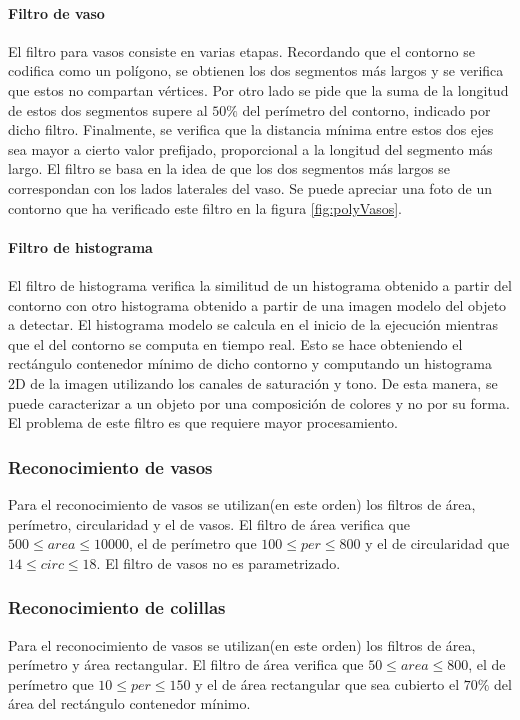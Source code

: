 	\paragraph{Filtro de vaso}
	El filtro para vasos consiste en varias etapas. Recordando que el contorno se codifica como un pol\'igono, se obtienen los dos segmentos 
	m\'as largos y se verifica que estos no compartan v\'ertices. Por otro lado se pide que la suma de la longitud de estos dos segmentos supere al $50\%$ del 
	per\'imetro del contorno, indicado por dicho filtro. Finalmente, se verifica que la distancia m\'inima entre estos dos ejes sea mayor a cierto valor prefijado, proporcional a la
	longitud del segmento m\'as largo. El filtro se basa en la idea de que 
	los dos segmentos m\'as largos se correspondan con los lados laterales 
	del vaso.  Se puede apreciar una foto  de un contorno que ha 
	verificado este filtro en la figura \ref{fig:polyVasos}. 
	\paragraph{Filtro de histograma}
	El filtro de histograma verifica la similitud de un histograma obtenido a partir del contorno con otro histograma obtenido a partir de 
	una imagen modelo del objeto a detectar. El histograma modelo se calcula en el inicio de la ejecuci\'on mientras que el del contorno se
	computa en tiempo real. Esto se hace obteniendo el rect\'angulo 
	contenedor m\'inimo de dicho contorno y computando un histograma 2D de la imagen
	utilizando los canales de saturaci\'on y tono. De esta manera, se 
	puede caracterizar a un objeto por una composici\'on de colores y no por su forma. El 
	problema de este filtro es que requiere mayor procesamiento.
	
	\subsubsection{Reconocimiento de vasos}
	Para el reconocimiento de vasos se utilizan(en este orden) los filtros de \'area, per\'imetro, circularidad y el de vasos.
	El filtro de \'area verifica que $500 \leq area \leq 10000 $, el de 
	per\'imetro que $100 \leq per \leq 800 $ y el de circularidad
	que $14 \leq circ \leq 18$. El filtro de vasos no es parametrizado. 
	
	\subsubsection{Reconocimiento de colillas}
	Para el reconocimiento de vasos se utilizan(en este orden) los filtros de \'area, per\'imetro y \'area rectangular.
	El filtro de \'area verifica que $50 \leq area \leq 800 $, el de per\'imetro que $10 \leq per \leq 150 $ y el de \'area rectangular
	que sea cubierto el $70\%$ del \'area del rect\'angulo contenedor m\'inimo.
	
